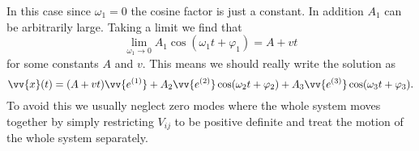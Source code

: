 \documentclass[fleqn]{NotesClass}
\begin{document}
    In this case since \(\omega_1 = 0\) the cosine factor is just a constant.
    In addition \(A_1\) can be arbitrarily large.
    Taking a limit we find that
    \begin{equation}
        \lim_{\omega_1 \to 0} A_1\cos(\omega_1 t + \varphi_1) = A + vt
    \end{equation}
    for some constants \(A\) and \(v\).
    This means we should really write the solution as
    \begin{equation}
        \vv{x}(t) = (A + vt) \vv{e^{(1)}} + A_2\vv{e^{(2)}}\cos(\omega_2 t + \varphi_2) + A_3 \vv{e^{(3)}} \cos(\omega_3 t + \varphi_3).
    \end{equation}
    To avoid this we usually neglect zero modes where the whole system moves together by simply restricting \(V_{ij}\) to be positive definite and treat the motion of the whole system separately.
    
\end{document}
